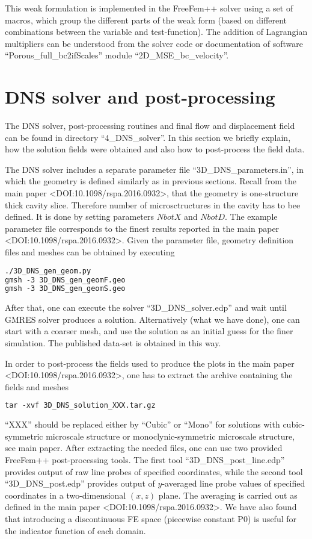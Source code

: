 \documentclass[12pt,a4paper]{article}
\begin{document}
This weak formulation is implemented in the FreeFem++ solver using a set of macros, which group the different parts of the weak form (based on different combinations between the variable and test-function). The addition of Lagrangian multipliers can be understood from the solver code or documentation of software ``Porous\_full\_bc2ifScales'' module ``2D\_MSE\_bc\_velocity''.


\section{DNS solver and post-processing}

The DNS solver, post-processing routines and final flow and displacement field can be found in directory ``4\_DNS\_solver''. In this section we briefly explain, how the solution fields were obtained and also how to post-process the field data.

The DNS solver includes a separate parameter file ``3D\_DNS\_parameters.in'', in which the geometry is defined similarly as in previous sections. Recall from the main paper <DOI:10.1098/rspa.2016.0932>, that the geometry is one-structure thick cavity slice. Therefore number of microsctructures in the cavity has to bee defined. It is done by setting parameters $NbotX$ and $NbotD$. The example parameter file corresponds to the finest results reported in the main paper <DOI:10.1098/rspa.2016.0932>. Given the parameter file, geometry definition files and meshes can be obtained by executing
\begin{lstlisting}[language=tex]
./3D_DNS_gen_geom.py
gmsh -3 3D_DNS_gen_geomF.geo
gmsh -3 3D_DNS_gen_geomS.geo
\end{lstlisting}
After that, one can execute the solver ``3D\_DNS\_solver.edp'' and wait until GMRES solver produces a solution. Alternatively (what we have done), one can start with a coarser mesh, and use the solution as an initial guess for the finer simulation. The published data-set is obtained in this way.

In order to post-process the fields used to produce the plots in the main paper <DOI:10.1098/rspa.2016.0932>, one has to extract the archive containing the fields and meshes
\begin{lstlisting}[language=tex]
tar -xvf 3D_DNS_solution_XXX.tar.gz
\end{lstlisting}

``XXX'' should be replaced either by ``Cubic'' or ``Mono'' for solutions with cubic-symmetric microscale structure or monoclynic-symmetric microscale structure, see main paper. After extracting the needed files, one can use two provided FreeFem++ post-processing tools. The first tool ``3D\_DNS\_post\_line.edp'' provides output of raw line probes of specified coordinates, while the second tool ``3D\_DNS\_post.edp'' provides output of $y$-averaged line probe values of specified coordinates in a two-dimensional $(x,z)$ plane. The averaging is carried out as defined in the main paper <DOI:10.1098/rspa.2016.0932>. We have also found that introducing a discontinuous FE space (piecewise constant P0) is useful for the indicator function of each domain.
\end{document}
